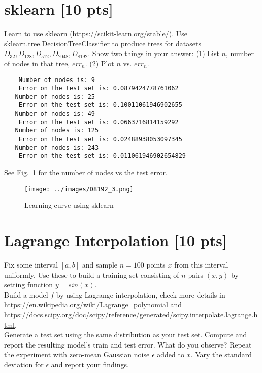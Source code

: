 \documentclass[a4paper]{article}
\theoremstyle{definition}
\newenvironment{soln}{
    \leavevmode\color{blue}\ignorespaces
}{}
\begin{document}
\section{sklearn [10 pts]}
Learn to use sklearn (\url{https://scikit-learn.org/stable/}).
Use sklearn.tree.DecisionTreeClassifier to produce trees for datasets $D_{32}, D_{128}, D_{512}, D_{2048}, D_{8192}$.  Show two things in your answer: (1) List $n$, number of nodes in that tree, $err_n$. (2) Plot $n$ vs. $err_n$.


\begin{soln}
  \begin{verbatim}
    Number of nodes is: 9 
    Error on the test set is: 0.0879424778761062
   Number of nodes is: 25 
    Error on the test set is: 0.10011061946902655
   Number of nodes is: 49 
    Error on the test set is: 0.0663716814159292
   Number of nodes is: 125 
    Error on the test set is: 0.02488938053097345
   Number of nodes is: 243 
    Error on the test set is: 0.011061946902654829   
  \end{verbatim}

  See Fig.~\ref{fig:lc_sk} for the number of nodes vs the test error.

  \begin{figure}[H]
    \centering
    \texttt{[image: ../images/D8192\_3.png]}
    \caption{Learning curve using sklearn}
    \label{fig:lc_sk}
  \end{figure}
\end{soln}


\section{Lagrange Interpolation [10 pts]}
Fix some interval $[a, b]$ and sample $n = 100$ points $x$ from this interval uniformly. Use these to build a training set consisting of $n$ pairs $(x, y)$ by setting function $y = sin(x)$. \\

Build a model $f$ by using Lagrange interpolation, check more details in \url{https://en.wikipedia.org/wiki/Lagrange_polynomial} and \url{https://docs.scipy.org/doc/scipy/reference/generated/scipy.interpolate.lagrange.html}. \\

Generate a test set using the same distribution as your test set. Compute and report the resulting model’s train and test error. What do you observe?
Repeat the experiment with zero-mean Gaussian noise $\epsilon$ added to $x$. Vary the standard deviation for $\epsilon$ and report your findings.
\end{document}
